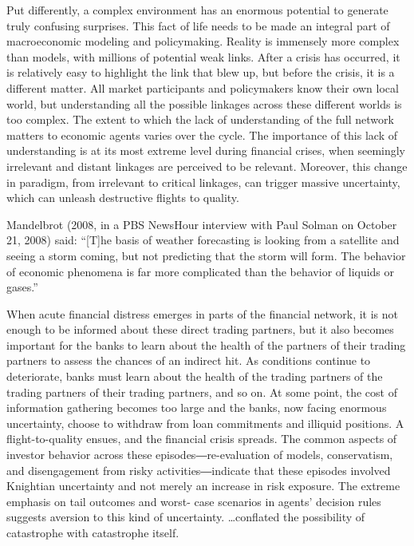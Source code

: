 \documentclass[
]{book}
\begin{document}
Put differently, a complex environment has an enormous potential to generate truly
confusing surprises. This fact of life needs to be made an integral part of macroeconomic
modeling and policymaking. Reality is immensely more complex than models, with millions of
potential weak links. After a crisis has occurred, it is relatively easy to highlight the link that
blew up, but before the crisis, it is a different matter. All market participants and policymakers
know their own local world, but understanding all the possible linkages across these different
worlds is too complex. The extent to which the lack of understanding of the full network matters
to economic agents varies over the cycle. The importance of this lack of understanding is at its
most extreme level during financial crises, when seemingly irrelevant and distant linkages are
perceived to be relevant. Moreover, this change in paradigm, from irrelevant to critical linkages,
can trigger massive uncertainty, which can unleash destructive flights to quality.

Mandelbrot (2008, in a PBS NewsHour interview with Paul Solman on October 21, 2008)
said: ``{[}T{]}he basis of weather forecasting is looking from a satellite and seeing a storm coming,
but not predicting that the storm will form. The behavior of economic phenomena is far more
complicated than the behavior of liquids or gases.''

When acute financial distress emerges in parts of the financial network, it is not
enough to be informed about these direct trading partners, but it also becomes important for the
banks to learn about the health of the partners of their trading partners to assess the chances of an
indirect hit. As conditions continue to deteriorate, banks must learn about the health of the
trading partners of the trading partners of their trading partners, and so on. At some point, the
cost of information gathering becomes too large and the banks, now facing enormous
uncertainty, choose to withdraw from loan commitments and illiquid positions.
A flight-to-quality ensues, and the financial
crisis spreads.
The common aspects of
investor behavior across these episodes―re-evaluation of models, conservatism, and
disengagement from risky activities―indicate that these episodes involved Knightian uncertainty
and not merely an increase in risk exposure. The extreme emphasis on tail outcomes and worst-
case scenarios in agents' decision rules suggests aversion to this kind of uncertainty.
\ldots conflated the possibility of catastrophe with catastrophe itself.
\end{document}
